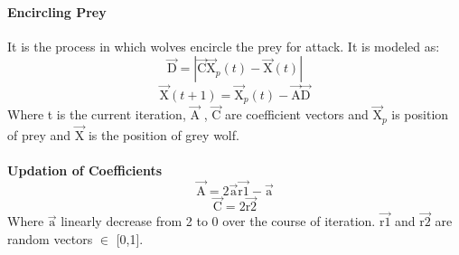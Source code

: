 \documentclass[12pt,a4paper]{article}
\begin{document}
\paragraph{Encircling Prey}
It is the process in which wolves encircle the prey for attack. It is modeled as:
\begin{equation}
    \overrightarrow{\text{D}} = |\overrightarrow{\text{C} }\overrightarrow{\text{X}}_p(t)  - \overrightarrow{\text{X}}(t)|
\end{equation}
\begin{equation}
    \overrightarrow{\text{X}}(t+1) = \overrightarrow{\text{X}}_p(t) - \overrightarrow{\text{A}}\overrightarrow{\text{D}}
\end{equation}
Where t is the current iteration, $\overrightarrow{\text{A}}$ , $\overrightarrow{\text{C}}$ are coefficient vectors and $\overrightarrow{\text{X}}_p$ is position of prey and $\overrightarrow{\text{X}}$ is the position of grey wolf.\\ \\
\textbf{Updation of Coefficients}
\begin{equation}
    \overrightarrow{\text{A}} = 2\overrightarrow{\text{a}}\overrightarrow{\text{r1}} - \overrightarrow{\text{a}}
\end{equation}
\begin{equation}
    \overrightarrow{\text{C}} = 2\overrightarrow{\text{r2}}
\end{equation}
Where $\overrightarrow{\text{a}}$ linearly decrease from 2 to 0 over the course of iteration. $\overrightarrow{\text{r1}}$ and $\overrightarrow{\text{r2}}$ are random vectors $\in$ [0,1].
\end{document}

